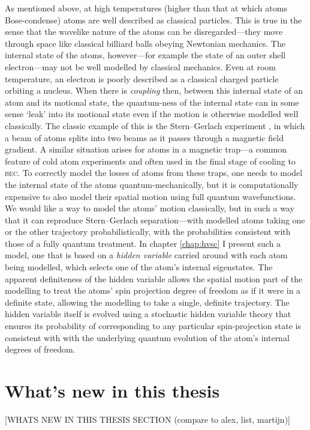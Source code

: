As mentioned above, at high temperatures (higher than that at which atoms Bose-condense) atoms are well described as classical particles. This is true in the sense that the wavelike nature of the atoms can be disregarded---they move through space like classical billiard balls obeying Newtonian mechanics. The internal state of the atoms, however---for example the state of an outer shell electron---may not be well modelled by classical mechanics. Even at room temperature, an electron is poorly described as a classical charged particle orbiting a nucleus. When there is \emph{coupling} then, between this internal state of an atom and its motional state, the quantum-ness of the internal state can in some sense `leak' into its motional state even if the motion is otherwise modelled well classically. The classic example of this is the Stern--Gerlach experiment \cite{gerlach_experimentelle_1922}, in which a beam of atoms splits into two beams as it passes through a magnetic field gradient. A similar situation arises for atoms in a magnetic trap---a common feature of cold atom experiments and often used in the final stage of cooling to \textsc{bec}. To correctly model the losses of atoms from these traps, one needs to model the internal state of the atoms quantum-mechanically, but it is computationally expensive to also model their spatial motion using full quantum wavefunctions. We would like a way to model the atoms' motion classically, but in such a way that it can reproduce Stern--Gerlach separation---with modelled atoms taking one or the other trajectory probabilistically, with the probabilities consistent with those of a fully quantum treatment. In chapter \ref{chap:hvsc} I present such a model, one that is based on a \emph{hidden variable} carried around with each atom being modelled, which selects one of the atom's internal eigenstates. The apparent definiteness of the hidden variable allows the spatial motion part of the modelling to treat the atoms' spin projection degree of freedom as if it were in a definite state, allowing the modelling to take a single, definite trajectory. The hidden variable itself is evolved using a stochastic hidden variable theory that ensures its probability of corresponding to any particular spin-projection state is consistent with with the underlying quantum evolution of the atom's internal degrees of freedom.

\section{What's new in this thesis}

[WHATS NEW IN THIS THESIS SECTION (compare to alex, list, martijn)]